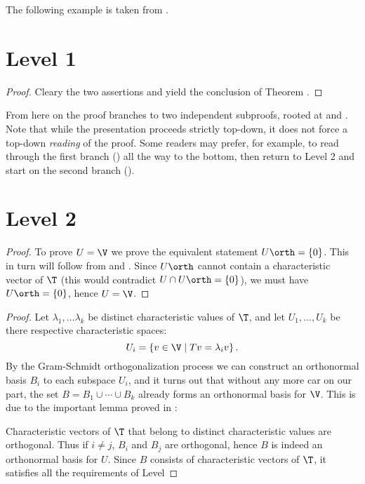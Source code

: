 \documentclass[10pt,twoside]{scrreprt}
\begin{document}
The  following  example is taken from .
\section*{Level 1}
 
\begin{proof} 
Cleary the two assertions  and  
yield the conclusion of Theorem .
\end{proof}
  
\elevator
From here on the proof branches to two independent subproofs, 
rooted at  and . 
Note that while the presentation proceeds strictly top-down, 
it does not force a top-down \emph{reading} of the proof. 
Some readers may prefer, for example, 
to read through the first branch () all the way to the bottom, 
then return to Level 2 and start on the second branch ().


\section*{Level 2}
\begin{proof}
To prove $U=\V$ we prove the equivalent statement $U\orth = \left\{ 0 \right\}$. 
This in turn will follow from  and . 
Since $U\orth$ cannot contain a characteristic vector of $\T$ 
(this would contradict $U \cap U\orth = \left\{ 0 \right\}$), 
we must have $U\orth = \left\{ 0 \right\}$, hence $U=\V$.
\end{proof}
  

\begin{proof}
Let $\lambda_1, \ldots \lambda_k$ be distinct characteristic values of $\T$, 
and let $U_1, \ldots , U_k$ be there respective characteristic spaces:
\[
  U_i = \left\{ v \in \V \;|\; T v = \lambda_i v  \right\}.
\]
By the Gram-Schmidt orthogonalization process 
we can construct an orthonormal basis $B_i$ to each subspace $U_i$, 
and it turns out that without any more car on our part, 
the set $B = B_1 \cup \cdots \cup B_k$ already forms an orthonormal basis for $\V$. 
This is due to the important lemma proved in : 

Characteristic vectors of $\T$ that belong to distinct characteristic values are orthogonal. 
Thus if $i \neq j$, $B_i$ and $B_j$ are orthogonal, 
hence $B$ is indeed an orthonormal basis for $U$. 
Since $B$ consists of characteristic vectors of $\T$, 
it satisfies all the requirements of Level 
\end{proof}
\end{document}
